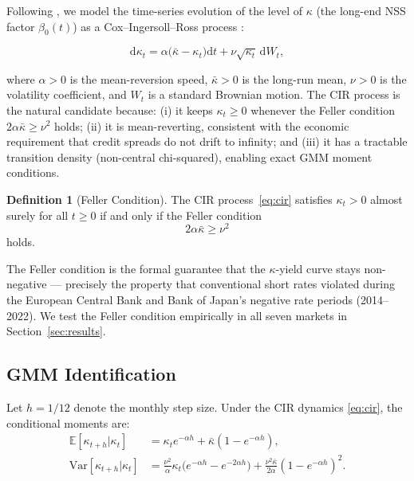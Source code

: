 \documentclass[12pt]{article}
\newcommand{\E}{\mathbb{E}}
\newcommand{\Var}{\mathrm{Var}}
\newcommand{\dd}{\mathrm{d}}
\theoremstyle{plain}
\theoremstyle{definition}
\newtheorem{definition}{Definition}[section]
\theoremstyle{remark}
\begin{document}
Following \citet{AhmedBhuyanIslam2026}, we model the time-series evolution of
the level of $\kappa$ (the long-end NSS factor $\beta_0(t)$) as a
Cox--Ingersoll--Ross process \citep{CIR1985}:

\begin{equation}
  \dd \kappa_t = \alpha\bigl(\bar{\kappa} - \kappa_t\bigr)\dd t
                 + \nu\sqrt{\kappa_t}\,\dd W_t,
  \label{eq:cir}
\end{equation}

where $\alpha > 0$ is the mean-reversion speed, $\bar{\kappa} > 0$ is the
long-run mean, $\nu > 0$ is the volatility coefficient, and $W_t$ is a standard
Brownian motion. The CIR process is the natural candidate because: (i) it keeps
$\kappa_t \geq 0$ whenever the Feller condition $2\alpha\bar{\kappa} \geq \nu^2$
holds; (ii) it is mean-reverting, consistent with the economic requirement that
credit spreads do not drift to infinity; and (iii) it has a tractable transition
density (non-central chi-squared), enabling exact GMM moment conditions.

\begin{definition}[Feller Condition]
The CIR process~\eqref{eq:cir} satisfies $\kappa_t > 0$ almost surely for all
$t \geq 0$ if and only if the Feller condition
\begin{equation}
  2\alpha\bar{\kappa} \geq \nu^2
  \label{eq:feller}
\end{equation}
holds.
\end{definition}

The Feller condition is the formal guarantee that the $\kappa$-yield curve
stays non-negative --- precisely the property that conventional short rates
violated during the European Central Bank and Bank of Japan's negative rate
periods (2014--2022). We test the Feller condition empirically in all seven
markets in Section~\ref{sec:results}.

\subsection{GMM Identification}

Let $h = 1/12$ denote the monthly step size. Under the CIR dynamics
\eqref{eq:cir}, the conditional moments are:
\begin{align}
  \E[\kappa_{t+h} | \kappa_t] &=
    \kappa_t e^{-\alpha h} + \bar{\kappa}(1 - e^{-\alpha h}),
  \label{eq:gmm1} \\
  \Var[\kappa_{t+h} | \kappa_t] &=
    \frac{\nu^2}{\alpha}\kappa_t\bigl(e^{-\alpha h} - e^{-2\alpha h}\bigr)
    + \frac{\nu^2\bar{\kappa}}{2\alpha}(1 - e^{-\alpha h})^2.
  \label{eq:gmm2}
\end{align}
\end{document}
